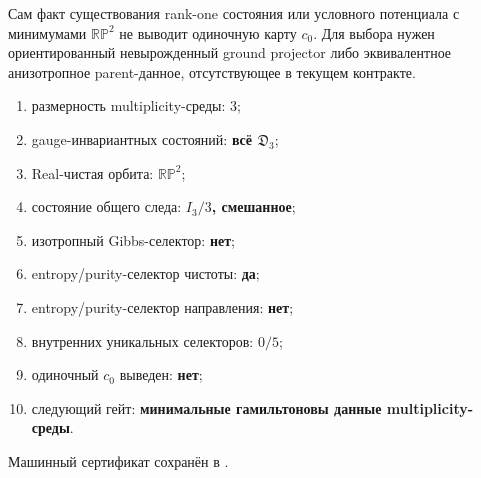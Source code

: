 \begin{nogocriterion}
Сам факт существования rank-one состояния или условного потенциала с
минимумами $\mathbb{RP}^2$ не выводит одиночную карту $c_0$. Для выбора
нужен ориентированный невырожденный ground projector либо эквивалентное
анизотропное parent-данное, отсутствующее в текущем контракте.
\end{nogocriterion}

\begin{protocol}\begin{enumerate}
\item размерность multiplicity-среды: \textbf{$3$};
\item gauge-инвариантных состояний: \textbf{всё $\mathfrak D_3$};
\item Real-чистая орбита: \textbf{$\mathbb{RP}^2$};
\item состояние общего следа: \textbf{$I_3/3$, смешанное};
\item изотропный Gibbs-селектор: \textbf{нет};
\item entropy/purity-селектор чистоты: \textbf{да};
\item entropy/purity-селектор направления: \textbf{нет};
\item внутренних уникальных селекторов: \textbf{$0/5$};
\item одиночный $c_0$ выведен: \textbf{нет};
\item следующий гейт: \textbf{минимальные гамильтоновы данные multiplicity-среды}.
\end{enumerate}\end{protocol}

Машинный сертификат сохранён в
.